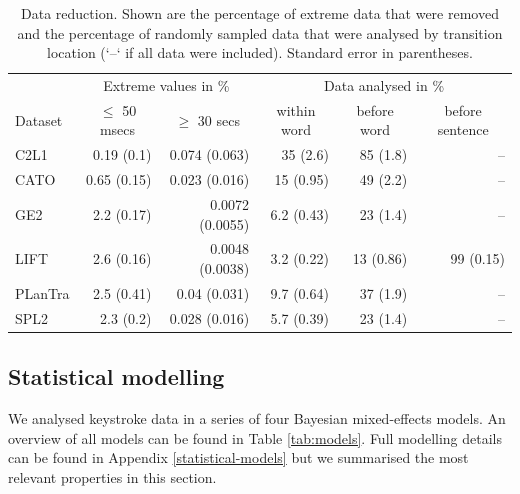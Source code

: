 \documentclass[
  man,floatsintext]{apa7}
\begin{document}
\begin{table}[bp!]

\begin{center}
\begin{threeparttable}

\caption{\label{tab:datareduction}Data reduction. Shown are the percentage of extreme data that were removed and the percentage of randomly sampled data that were analysed by transition location (`--` if all data were included). Standard error in parentheses.}

\begin{tabular}{lrrrrr}
\toprule
 \multicolumn{1}{c}{ } & \multicolumn{2}{c}{Extreme values in \%} & \multicolumn{3}{c}{Data analysed in \%} \\
\cmidrule(r){1-1} \cmidrule(r){2-3} \cmidrule(r){4-6}
Dataset & \multicolumn{1}{c}{$\le$ 50 msecs} & \multicolumn{1}{c}{$\ge$ 30 secs} & \multicolumn{1}{c}{within word} & \multicolumn{1}{c}{before word} & \multicolumn{1}{c}{before sentence}\\
\midrule
C2L1 & 0.19 (0.1) & 0.074 (0.063) & 35 (2.6) & 85 (1.8) & --\\
CATO & 0.65 (0.15) & 0.023 (0.016) & 15 (0.95) & 49 (2.2) & --\\
GE2 & 2.2 (0.17) & 0.0072 (0.0055) & 6.2 (0.43) & 23 (1.4) & --\\
LIFT & 2.6 (0.16) & 0.0048 (0.0038) & 3.2 (0.22) & 13 (0.86) & 99 (0.15)\\
PLanTra & 2.5 (0.41) & 0.04 (0.031) & 9.7 (0.64) & 37 (1.9) & --\\
SPL2 & 2.3 (0.2) & 0.028 (0.016) & 5.7 (0.39) & 23 (1.4) & --\\
\bottomrule
\end{tabular}

\end{threeparttable}
\end{center}

\end{table}

\hypertarget{statistical-modelling}{%
\subsection{Statistical modelling}\label{statistical-modelling}}

We analysed keystroke data in a series of four Bayesian mixed-effects models. An overview of all models can be found in Table \ref{tab:models}. Full modelling details can be found in Appendix \ref{statistical-models} but we summarised the most relevant properties in this section.
\end{document}
